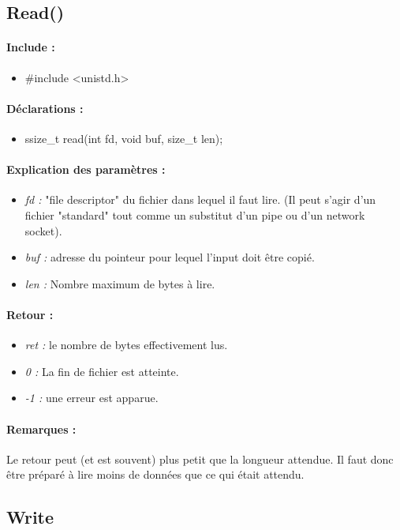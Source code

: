\documentclass{article}[12pt]
\begin{document}
\subsection{Read()}
\paragraph{Include : }
\begin{itemize}
	\item \#include <unistd.h>
\end{itemize}
\paragraph{Déclarations : }
\begin{itemize}
	\item ssize\_t read(int fd, void \* buf, size\_t len);
\end{itemize}
\paragraph{Explication des paramètres : }
\begin{itemize}
	\item \emph{fd : } "file descriptor" du fichier dans lequel il faut lire. (Il peut s'agir d'un fichier "standard" tout comme un substitut d'un pipe ou d'un network socket).
	\item \emph{buf : } adresse du pointeur pour lequel l'input doit être copié.
	\item \emph{len : } Nombre maximum de bytes à lire.
\end{itemize}
\paragraph{Retour : }
\begin{itemize}
	\item \emph{ret : } le nombre de bytes effectivement lus.
	\item \emph{0 : } La fin de fichier est atteinte.
	\item \emph{-1 : } une erreur est apparue.
\end{itemize}
\paragraph{Remarques : }
Le retour peut (et est souvent) plus petit que la longueur attendue. Il faut donc être préparé à lire moins de données que ce qui était attendu. 
\subsection{Write}
\end{document}
